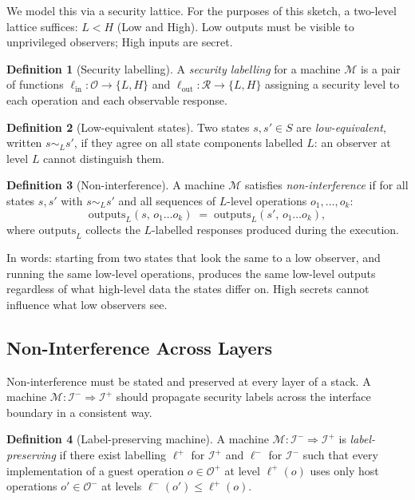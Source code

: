 \documentclass[11pt, a4paper]{article}
\theoremstyle{definition}
\newtheorem{definition}{Definition}[section]
\theoremstyle{plain}
\theoremstyle{remark}
\begin{document}
We model this via a security lattice. For the purposes of this sketch, a
two-level lattice suffices: $L < H$ (Low and High). Low outputs must be
visible to unprivileged observers; High inputs are secret.

\begin{definition}[Security labelling]
  A \emph{security labelling} for a machine $\mathcal{M}$ is a pair of
  functions $\ell_{\mathrm{in}} : \mathcal{O} \to \{L, H\}$ and
  $\ell_{\mathrm{out}} : \mathcal{R} \to \{L, H\}$ assigning a security
  level to each operation and each observable response.
\end{definition}

\begin{definition}[Low-equivalent states]
  Two states $s, s' \in S$ are \emph{low-equivalent}, written
  $s \sim_L s'$, if they agree on all state components labelled $L$:
  an observer at level $L$ cannot distinguish them.
\end{definition}

\begin{definition}[Non-interference]
  A machine $\mathcal{M}$ satisfies \emph{non-interference} if for all
  states $s, s'$ with $s \sim_L s'$ and all sequences of $L$-level
  operations $o_1, \ldots, o_k$:
  \[
    \text{outputs}_L(s,\, o_1 \ldots o_k)
    \;=\;
    \text{outputs}_L(s',\, o_1 \ldots o_k),
  \]
  where $\text{outputs}_L$ collects the $L$-labelled responses produced
  during the execution.
\end{definition}

In words: starting from two states that look the same to a low observer,
and running the same low-level operations, produces the same low-level
outputs regardless of what high-level data the states differ on. High
secrets cannot influence what low observers see.

\subsection{Non-Interference Across Layers}

Non-interference must be stated and preserved at every layer of a stack.
A machine $\mathcal{M} : \mathcal{I}^- \Rightarrow \mathcal{I}^+$ should
propagate security labels across the interface boundary in a consistent way.

\begin{definition}[Label-preserving machine]
  A machine $\mathcal{M} : \mathcal{I}^- \Rightarrow \mathcal{I}^+$ is
  \emph{label-preserving} if there exist labelling
  $\ell^+$ for $\mathcal{I}^+$ and $\ell^-$ for $\mathcal{I}^-$ such that
  every implementation of a guest operation $o \in \mathcal{O}^+$ at level
  $\ell^+(o)$ uses only host operations $o' \in \mathcal{O}^-$ at levels
  $\ell^-(o') \leq \ell^+(o)$.
\end{definition}
\end{document}
